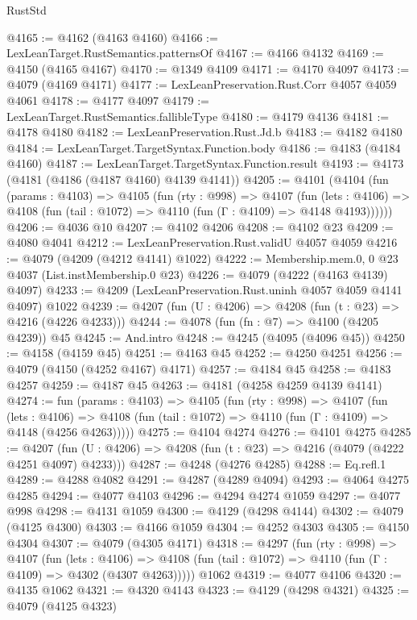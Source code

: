 \begin{lexlean}{RustStd}
\begin{coremodule}
@4165 := @4162 (@4163 @4160)
@4166 := LexLeanTarget.RustSemantics.patternsOf
@4167 := @4166 @4132
@4169 := @4150 (@4165 @4167)
@4170 := @1349 @4109
@4171 := @4170 @4097
@4173 := @4079 (@4169 @4171)
@4177 := LexLeanPreservation.Rust.Corr @4057 @4059 @4061
@4178 := @4177 @4097
@4179 := LexLeanTarget.RustSemantics.fallibleType
@4180 := @4179 @4136
@4181 := @4178 @4180
@4182 := LexLeanPreservation.Rust.Jd.b
@4183 := @4182 @4180
@4184 := LexLeanTarget.TargetSyntax.Function.body
@4186 := @4183 (@4184 @4160)
@4187 := LexLeanTarget.TargetSyntax.Function.result
@4193 := @4173 (@4181 (@4186 (@4187 @4160) @4139 @4141))
@4205 := @4101
    (@4104
      (fun (params : @4103) =>
      @4105
        (fun (rty : @998) =>
        @4107
          (fun (lets : @4106) =>
          @4108 (fun (tail : @1072) => @4110 (fun (Γ : @4109) => @4148 @4193))))))
@4206 := @4036 @10
@4207 := @4102 @4206
@4208 := @4102 @23
@4209 := @4080 @4041
@4212 := LexLeanPreservation.Rust.validU @4057 @4059
@4216 := @4079 (@4209 (@4212 @4141) @1022)
@4222 := Membership.mem.{0, 0} @23 @4037 (List.instMembership.{0} @23)
@4226 := @4079 (@4222 (@4163 @4139) @4097)
@4233 := @4209 (LexLeanPreservation.Rust.uninh @4057 @4059 @4141 @4097) @1022
@4239 := @4207 (fun (U : @4206) => @4208 (fun (t : @23) => @4216 (@4226 @4233)))
@4244 := @4078 (fun (fn : @7) => @4100 (@4205 @4239)) @45
@4245 := And.intro
@4248 := @4245 (@4095 (@4096 @45))
@4250 := @4158 (@4159 @45)
@4251 := @4163 @45
@4252 := @4250 @4251
@4256 := @4079 (@4150 (@4252 @4167) @4171)
@4257 := @4184 @45
@4258 := @4183 @4257
@4259 := @4187 @45
@4263 := @4181 (@4258 @4259 @4139 @4141)
@4274 := fun (params : @4103) =>
  @4105
    (fun (rty : @998) =>
    @4107
      (fun (lets : @4106) =>
      @4108 (fun (tail : @1072) => @4110 (fun (Γ : @4109) => @4148 (@4256 @4263)))))
@4275 := @4104 @4274
@4276 := @4101 @4275
@4285 := @4207 (fun (U : @4206) => @4208 (fun (t : @23) => @4216 (@4079 (@4222 @4251 @4097) @4233)))
@4287 := @4248 (@4276 @4285)
@4288 := Eq.refl.{1}
@4289 := @4288 @4082
@4291 := @4287 (@4289 @4094)
@4293 := @4064 @4275 @4285
@4294 := @4077 @4103
@4296 := @4294 @4274 @1059
@4297 := @4077 @998
@4298 := @4131 @1059
@4300 := @4129 (@4298 @4144)
@4302 := @4079 (@4125 @4300)
@4303 := @4166 @1059
@4304 := @4252 @4303
@4305 := @4150 @4304
@4307 := @4079 (@4305 @4171)
@4318 := @4297
    (fun (rty : @998) =>
    @4107
      (fun (lets : @4106) =>
      @4108 (fun (tail : @1072) => @4110 (fun (Γ : @4109) => @4302 (@4307 @4263)))))
    @1062
@4319 := @4077 @4106
@4320 := @4135 @1062
@4321 := @4320 @4143
@4323 := @4129 (@4298 @4321)
@4325 := @4079 (@4125 @4323)

\end{coremodule}
\end{lexlean}
